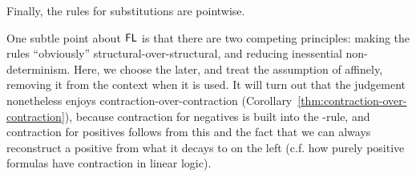 Finally, the rules for substitutions are pointwise.

One subtle point about $\mathsf{FL}$ is that there are two competing principles:
making the rules ``obviously'' structural-over-structural, and reducing
inessential non-determinism.  Here, we choose the later, and treat the
assumption of \F{\alpha}{\Delta} affinely, removing it from the context
when it is used.  It will turn out that the judgement nonetheless enjoys
contraction-over-contraction
(Corollary~\ref{thm:contraction-over-contraction}), because contraction
for negatives is built into the \UL-rule, and contraction for positives
follows from this and the fact that we can always reconstruct a positive
from what it decays to on the left (c.f. how purely positive formulas
have contraction in linear logic).

